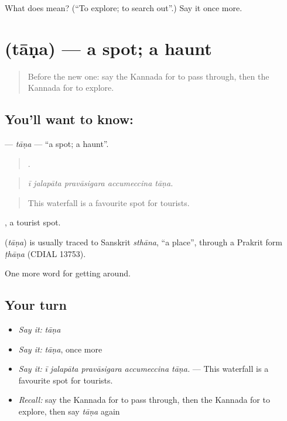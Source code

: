 \begin{tcolorbox}[breakable,colback=teal!4,colframe=teal!35!black,title={Before you move on}]
What does  mean? (\textquotedblleft{}To explore; to search out\textquotedblright{}.) Say it once more.
\end{tcolorbox}
\section[\texorpdfstring{\kn{ತಾಣ} (tāṇa)}{ತಾಣ (tāṇa)}]{ (tāṇa) — a spot; a haunt}

\label{lesson:KA-C457-tana}



\begin{quote}
Before the new one: say the Kannada for to pass through, then the Kannada for to explore.
\end{quote}

\subsection*{You'll want to know: }
\textbf{} — \emph{tāṇa} — \textquotedblleft{}a spot; a haunt\textquotedblright{}.

\begin{quote}
    .
\end{quote}

\begin{quote}
\emph{ī jalapāta pravāsigara accumeccina tāṇa.}
\end{quote}

\begin{quote}
This waterfall is a favourite spot for tourists.
\end{quote}

 , a tourist spot.

\begin{cousinweb}
\textbf{} (\emph{tāṇa}) is usually traced to Sanskrit \emph{sthāna}, \textquotedblleft{}a place\textquotedblright{}, through a Prakrit form \emph{ṭhāṇa} (CDIAL 13753).
\end{cousinweb}

\begin{grammarlens}[title={What you've built}]
One more word for getting around.
\end{grammarlens}

\subsection*{Your turn}
\begin{itemize}
\raggedright
  \item \emph{Say it:} \emph{tāṇa}
  \item \emph{Say it:} \emph{tāṇa}, once more
  \item \emph{Say it:} \emph{ī jalapāta pravāsigara accumeccina tāṇa.} — This waterfall is a favourite spot for tourists.
  \item \emph{Recall:} say the Kannada for to pass through, then the Kannada for to explore, then say \emph{tāṇa} again
\end{itemize}

